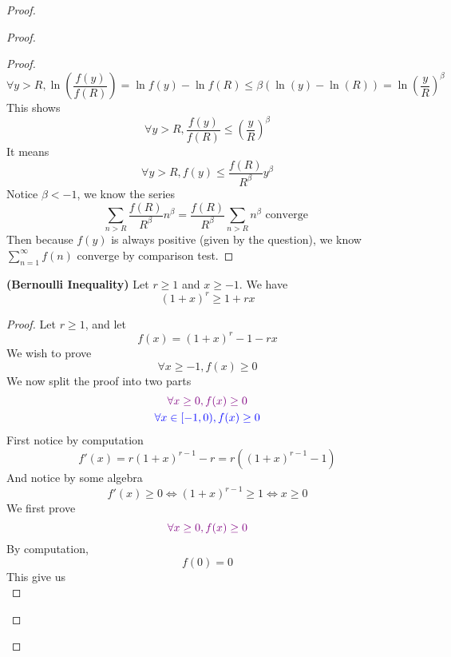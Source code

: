 \documentclass{report}
\begin{document}
\begin{proof}
\begin{proof}
\begin{proof}
\begin{equation}
\forall y>R,\ln ( \frac{f(y)}{f(R)})=\ln f(y)-\ln f(R)\leq \beta (\ln(y)-\ln(R))= \ln(\frac{y}{R})^\beta 
\end{equation}
This shows
\begin{equation}
\forall y>R, \frac{f(y)}{f(R)}\leq (\frac{y}{R})^{\beta }
\end{equation}
It means
\begin{equation}
\forall y>R, f(y)\leq \frac{f(R)}{R^{\beta }}y^{\beta }
\end{equation}
Notice $\beta <-1$, we know the series 
\begin{equation}
\sum_{n>R} \frac{f(R)}{R^{\beta }}n^{\beta }=\frac{f(R)}{R^{\beta }}\sum_{n>R}n^{\beta }\text{ converge }
\end{equation}
Then because $f(y)$ is always positive (given by the question), we know $\sum_{n=1}^\infty f(n)$ converge by comparison test.
\end{proof}
\begin{lemma}
\label{6.3.4}
\textbf{(Bernoulli Inequality)} Let  $r\geq 1$ and $x\geq -1$. We have
\begin{equation}
  (1+x)^r\geq 1+rx
\end{equation}
\end{lemma}
\begin{proof}
Let $r\geq 1$, and let
\begin{equation}
f(x)=(1+x)^r-1-rx
\end{equation}
We wish to prove 
\begin{equation}
\forall x\geq -1, f(x)\geq 0
\end{equation}
We now split the proof into two parts
\begin{gather}
  \textcolor{violet}{\forall x\geq 0, f(x)\geq 0}\\
  \textcolor{blue}{\forall x\in [-1,0), f(x)\geq 0}
\end{gather}
First notice by computation
\begin{equation}
f'(x)=r(1+x)^{r-1}-r=r((1+x)^{r-1}-1)
\end{equation}
And notice by some algebra
\begin{equation}
f'(x)\geq 0\iff  (1+x)^{r-1}\geq 1\iff  x\geq 0
\end{equation}
We first prove 
\begin{equation}
\textcolor{violet}{\forall x\geq 0, f(x)\geq 0}
\end{equation}
By computation,
\begin{equation}
f(0)=0
\end{equation}
This give us 
\begin{equation}

\end{equation}
\end{proof}
\end{proof}
\end{proof}
\end{document}
